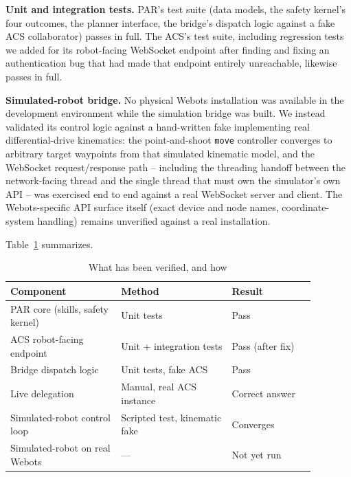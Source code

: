 \documentclass{article}
\begin{document}
\textbf{Unit and integration tests.} PAR's test suite (data models, the
safety kernel's four outcomes, the planner interface, the bridge's
dispatch logic against a fake ACS collaborator) passes in full. The ACS's
test suite, including regression tests we added for its robot-facing
WebSocket endpoint after finding and fixing an authentication bug that had
made that endpoint entirely unreachable, likewise passes in full.

\textbf{Simulated-robot bridge.} No physical Webots installation was
available in the development environment while the simulation bridge was
built. We instead validated its control logic against a hand-written fake
implementing real differential-drive kinematics: the point-and-shoot
\texttt{move} controller converges to arbitrary target waypoints from that
simulated kinematic model, and the WebSocket request/response path --
including the threading handoff between the network-facing thread and the
single thread that must own the simulator's own API -- was exercised end
to end against a real WebSocket server and client. The Webots-specific API
surface itself (exact device and node names, coordinate-system handling)
remains unverified against a real installation.

Table~\ref{tab:eval} summarizes.

\begin{table}[t]
\centering
\caption{What has been verified, and how}
\label{tab:eval}
\begin{tabular}{@{}p{0.32\linewidth}p{0.32\linewidth}p{0.24\linewidth}@{}}
\toprule
\textbf{Component} & \textbf{Method} & \textbf{Result} \\
\midrule
PAR core (skills, safety kernel) & Unit tests & Pass \\
ACS robot-facing endpoint & Unit + integration tests & Pass (after fix) \\
Bridge dispatch logic & Unit tests, fake ACS & Pass \\
Live delegation & Manual, real ACS instance & Correct answer \\
Simulated-robot control loop & Scripted test, kinematic fake & Converges \\
Simulated-robot on real Webots & --- & Not yet run \\
\bottomrule
\end{tabular}
\end{table}
\end{document}

